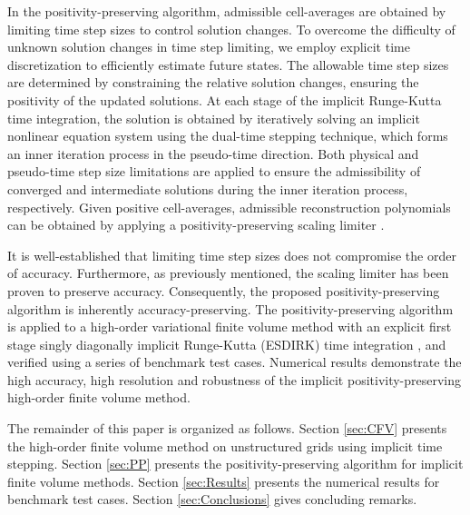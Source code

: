 {In the positivity-preserving algorithm, admissible cell-averages are obtained by limiting time step sizes to control solution changes. To overcome the difficulty of unknown solution changes in time step limiting, we employ explicit time discretization to efficiently estimate future states. 
The allowable time step sizes are determined by constraining the relative solution changes, ensuring the positivity of the updated solutions. At each stage of the implicit Runge-Kutta time integration, the solution is obtained by iteratively solving an implicit nonlinear equation system using the dual-time stepping technique, which forms an inner iteration process in the pseudo-time direction. Both physical and pseudo-time step size limitations are applied to ensure the admissibility of converged and intermediate solutions during the inner iteration process, respectively.
Given positive cell-averages, admissible reconstruction polynomials can be obtained by applying a positivity-preserving scaling limiter \cite{zhang2010positivity}.} 

It is well-established that limiting time step sizes does not compromise the order of accuracy. Furthermore, as previously mentioned, the scaling limiter has been proven to preserve accuracy. Consequently, the proposed positivity-preserving algorithm is inherently accuracy-preserving. 
The positivity-preserving algorithm is applied to a high-order variational finite volume method \cite{wang2017compact_VR} with an explicit first stage singly diagonally implicit Runge-Kutta (ESDIRK) time integration \cite{bijl2002implicitBDFvESDIRK}, and verified using a series of benchmark test cases. Numerical results demonstrate the high accuracy, high resolution and robustness of the implicit positivity-preserving high-order finite volume method.

The remainder of this paper is organized as follows. Section \ref{sec:CFV} presents the high-order finite volume method on unstructured grids using implicit time stepping. Section \ref{sec:PP} presents the positivity-preserving algorithm for implicit finite volume methods.
Section \ref{sec:Results} presents the numerical results for benchmark test cases. Section \ref{sec:Conclusions} gives concluding remarks.